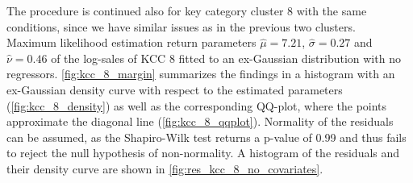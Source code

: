 
The procedure is continued also for key category cluster 8 with the same conditions, since we have similar issues as in the previous two clusters.
\\

Maximum likelihood estimation return parameters $\hat{\mu} = 7.21$, $\hat{\sigma} = 0.27$ and $\hat{\nu} = 0.46$ of the log-sales of \ac{KCC} 8 fitted to an ex-Gaussian distribution with no regressors.
\autoref{fig:kcc_8_margin} summarizes the findings in a histogram with an ex-Gaussian density curve with respect to the estimated parameters (\autoref{fig:kcc_8_density}) as well as the corresponding QQ-plot, where the points approximate the diagonal line (\autoref{fig:kcc_8_qqplot}). Normality of the residuals can be assumed, as the Shapiro-Wilk test returns a p-value of 0.99 and thus fails to reject the null hypothesis of non-normality. A histogram of the residuals and their density curve are shown in \autoref{fig:res_kcc_8_no_covariates}.
\\


%



